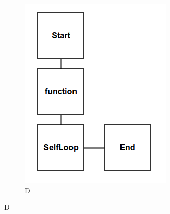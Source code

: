 \documentclass[14pt]{matmex-diploma}
\begin{document}
\begin{figure}
    \centering
    \begin{subfigure}[b]{0.4\textwidth}
        \includegraphics[width=\textwidth]{images/blockScheme4.png}
        \caption{D}
        \label{fig:D}
    \end{subfigure}
    

\end{figure}
\end{document}

